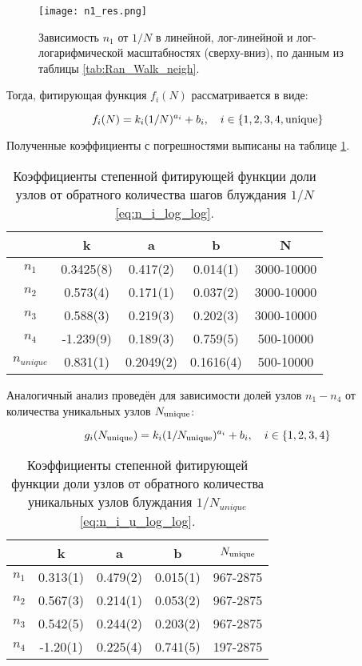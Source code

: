 \begin{figure}
\centering
\texttt{[image: n1\_res.png]}
\caption{Зависимость $n_1$ от $1/N$  в линейной, лог-линейной и лог-логарифмической масштабностях (сверху-вниз), по данным из таблицы \ref{tab:Ran_Walk_neigh}.} 
\label{fig:n1_scale}
\end{figure}

Тогда, фитирующая функция $f_i(N)$ рассматривается в виде:

\begin{equation}
f_i(N) = k_i (1/N)^{a_i} + b_i,\ \ \ i \in \{1,2,3,4, \textup{unique}\}
\label{eq:n_i_log_log}
\end{equation}

Полученные коэффициенты с погрешностями выписаны на таблице \ref{tab:n_i_log_log}.

\begin{table}[h]
\centering
\begin{tabular}{|c|c|c|c|c|}
\hline
 & k & a & b & N \\ \hline
$n_1$ & 0.3425(8) & 0.417(2) & 0.014(1) & 3000-10000 \\ \hline
$n_2$ & 0.573(4) & 0.171(1) & 0.037(2) & 3000-10000 \\ \hline
$n_3$ & 0.588(3) & 0.219(3) & 0.202(3) & 3000-10000 \\ \hline
$n_4$ & -1.239(9) & 0.189(3) & 0.759(5) & 500-10000 \\ \hline
$n_{unique}$ & 0.831(1) & 0.2049(2) & 0.1616(4) & 500-10000 \\ \hline
\end{tabular}
\caption{Коэффициенты степенной фитирующей функции доли узлов от обратного количества шагов блуждания $1/N$ \eqref{eq:n_i_log_log}.}
\label{tab:n_i_log_log}
\end{table}
Аналогичный анализ проведён для зависимости долей узлов $n_1 - n_4$ от количества уникальных узлов $N_{\textup{unique}}$:

\begin{equation}
g_i (\Nun) = k_i  (1/\Nun)^{a_i} + b_i,\ \ \ i \in \{1,2,3,4\}
\label{eq:n_i_u_log_log}
\end{equation}

\begin{table}[h]
\centering
\begin{tabular}{|c|c|c|c|c|}
\hline
 & k & a & b & $N_{\textup{unique}}$ \\ \hline
$n_1$ & 0.313(1) & 0.479(2) & 0.015(1) & 967-2875 \\ \hline
$n_2$ & 0.567(3) & 0.214(1) & 0.053(2) & 967-2875 \\ \hline
$n_3$  & 0.542(5) & 0.244(2) & 0.203(2) & 967-2875 \\ \hline
$n_4$ & -1.20(1) & 0.225(4) & 0.741(5) & 197-2875 \\ \hline
\end{tabular} 
\caption{Коэффициенты степенной фитирующей функции доли узлов от обратного количества уникальных узлов блуждания $1/N_{unique}$ \eqref{eq:n_i_u_log_log}.}
\label{tab:n_i_u_log_log}
\end{table}

